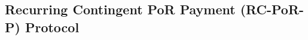 
\subsection{Recurring Contingent PoR Payment (RC-PoR-P) Protocol}\label{sec::RC-PoR-P-protocol}


%
%
%
%
%
